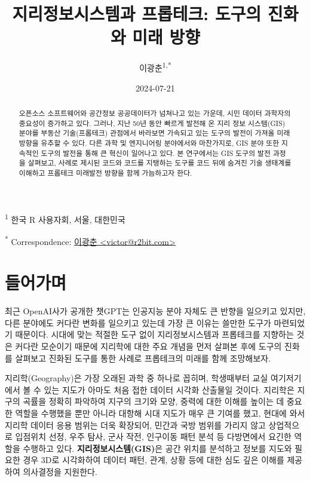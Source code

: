 \documentclass[
  a4paper,showtrims,openright,hidelinks]{oblivoir}
\title{지리정보시스템과 프롭테크: 도구의 진화와 미래 방향}
\author{이광춘\textsuperscript{1,*}}
\date{2024-07-21}
\begin{document}
\maketitle
\begin{abstract}
오픈소스 소프트웨어와 공간정보 공공데이터가 넘쳐나고 있는 가운데, 시민
데이터 과학자의 중요성이 증가하고 있다. 그러나, 지난 50년 동안 빠르게
발전해 온 지리 정보 시스템(GIS) 분야를 부동산 기술(프롭테크) 관점에서
바라보면 가속되고 있는 도구의 발전이 가져올 미래 방향을 유추할 수 있다.
다른 과학 및 엔지니어링 분야에서와 마찬가지로, GIS 분야 또한 지속적인
도구의 발전을 통해 큰 혁신이 일어나고 있다. 본 연구에서는 GIS 도구의
발전 과정을 살펴보고, 사례로 제시된 코드와 코드를 지탱하는 도구를 코드
뒤에 숨겨진 기술 생태계를 이해하고 프롭테크 미래발전 방향을 함께
가늠하고자 한다.
\end{abstract}

\textsuperscript{1} 한국 R 사용자회, 서울, 대한민국

\textsuperscript{*} Correspondence:
\href{mailto:victor@r2bit.com}{이광춘
\textless{}victor@r2bit.com\textgreater{}}

\section{들어가며}\label{uxb4e4uxc5b4uxac00uxba70}

최근 OpenAI사가 공개한 챗GPT는 인공지능 분야 자체도 큰 반향을 일으키고
있지만, 다른 분야에도 커다란 변화를 일으키고 있는데 가장 큰 이유는
쓸만한 도구가 마련되었기 때문이다. 시대에 맞는 적절한 도구 없이
지리정보시스템과 프롭테크를 지향하는 것은 커다란 모순이기 때문에
지리학에 대한 주요 개념을 먼저 살펴본 후에 도구의 진화를 살펴보고 진화된
도구를 통한 사례로 프롭테크의 미래를 함께 조망해보자.
\autocite{ChatGPT2023}

지리학(Geography)은 가장 오래된 과학 중 하나로 꼽히며, 학생때부터 교실
여기저기에서 볼 수 있는 지도가 아마도 처음 접한 데이터 시각화 산출물일
것이다. 지리학은 지구의 곡률을 정확히 파악하여 지구의 크기와 모양,
중력에 대한 이해를 높이는 데 중요한 역할을 수행했을 뿐만 아니라 대항해
시대 지도가 매우 큰 기여를 했고, 현대에 와서 지리학 데이터 응용 범위는
더욱 확장되어, 민간과 국방 범위를 가리지 않고 상업적으로 입점위치 선정,
우주 탐사, 군사 작전, 인구이동 패턴 분석 등 다방면에서 요긴한 역할을
수행하고 있다. \textbf{지리정보시스템(GIS)}은 공간 위치를 분석하고
정보를 지도와 필요한 경우 3D로 시각화하여 데이터 패턴, 관계, 상황 등에
대한 심도 깊은 이해를 제공하여 의사결정을 지원한다.
\end{document}
